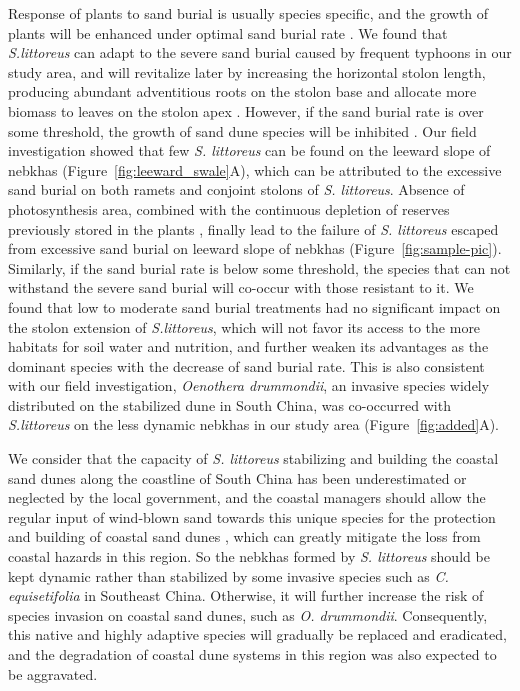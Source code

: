 \documentclass[]{interact}
\theoremstyle{plain}%
\theoremstyle{definition}
\theoremstyle{remark}
\begin{document}
Response of plants to sand burial is usually species specific, and the growth of plants will be enhanced under optimal sand burial rate \citep{noletUAVimagingModelGrowth2018}. We found that \textit{S.littoreus} can adapt to the severe sand burial caused by frequent typhoons in our study area, and will revitalize later by increasing the horizontal stolon length, producing abundant adventitious roots on the stolon base and allocate more biomass to leaves on the stolon apex \citep{yuanEffectsSandAccretion1993}. However, if the sand burial rate is over some threshold, the growth of sand dune species will be inhibited \citep{maunEffectsBurialSand1996, shiEffectsSandBurial2004}. Our field investigation showed that few \textit{S. littoreus} can be found on the leeward slope of nebkhas (Figure~\ref{fig:leeward_swale}A), which can be attributed to the excessive sand burial on both ramets and conjoint stolons of \textit{S. littoreus}. Absence of photosynthesis area, combined with the continuous depletion of reserves previously stored in the plants \citep{frosiniGlobalChangeResponse2012}, finally lead to the failure of \textit{S. littoreus} escaped from excessive sand burial on leeward slope of nebkhas (Figure~\ref{fig:sample-pic}).  Similarly, if the sand burial rate is below some threshold, the species that can not withstand the severe sand burial will co-occur with those resistant to it. We found that low to moderate sand burial treatments had no significant impact on the stolon extension of \textit{S.littoreus}, which will not favor its access to the more habitats for soil water and nutrition, and further weaken its advantages as the dominant species with the decrease of sand burial rate. This is also consistent with our field investigation, \textit{Oenothera drummondii}, an invasive species widely distributed on the stabilized dune in South China, was co-occurred with \textit{S.littoreus} on the less dynamic nebkhas in our study area (Figure~\ref{fig:added}A).

We consider that the capacity of \textit{S. littoreus} stabilizing and building the coastal sand dunes along the coastline of South China has been  underestimated or neglected by the local government, and the coastal managers should allow the regular input of wind-blown sand towards this unique species for the protection and building of coastal sand dunes \citep{noletUAVimagingModelGrowth2018}, which can greatly mitigate the loss from coastal hazards in this region. So the nebkhas formed by \textit{S. littoreus} should be kept dynamic rather than stabilized by some invasive species such as \textit{C. equisetifolia} in Southeast China. Otherwise, it will further increase the risk of species invasion on coastal sand dunes, such as \textit{O. drummondii}. Consequently, this native and highly adaptive species will gradually be replaced and eradicated, and  the degradation of coastal dune systems in this region was also expected to be aggravated.
\end{document}
